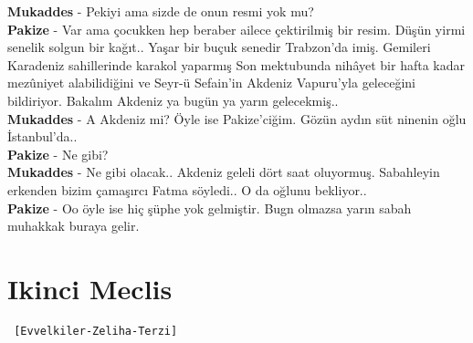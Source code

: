 \documentclass[]{book}
\begin{document}
\textbf{Mukaddes} - Pekiyi ama sizde de onun resmi yok mu?\\
\textbf{Pakize} - Var ama çocukken hep beraber ailece çektirilmiş bir resim. Düşün yirmi senelik solgun bir kağıt.. Yaşar bir buçuk senedir Trabzon'da imiş. Gemileri Karadeniz sahillerinde karakol yaparmış Son mektubunda nihâyet bir hafta kadar mezûniyet alabilidiğini ve Seyr-ü Sefain'in Akdeniz Vapuru'yla geleceğini bildiriyor. Bakalım Akdeniz ya bugün ya yarın gelecekmiş..\\
\textbf{Mukaddes} - A Akdeniz mi? Öyle ise Pakize'ciğim. Gözün aydın süt ninenin oğlu İstanbul'da..\\
\textbf{Pakize} - Ne gibi?\\
\textbf{Mukaddes} - Ne gibi olacak.. Akdeniz geleli dört saat oluyormuş. Sabahleyin erkenden bizim çamaşırcı Fatma söyledi.. O da oğlunu bekliyor..\\
\textbf{Pakize} - Oo öyle ise hiç şüphe yok gelmiştir. Bugn olmazsa yarın sabah muhakkak buraya gelir.\\

\hypertarget{ikinci-meclis}{%
\section{Ikinci Meclis}\label{ikinci-meclis}}

\begin{verbatim}
 [Evvelkiler-Zeliha-Terzi]
\end{verbatim}
\end{document}
